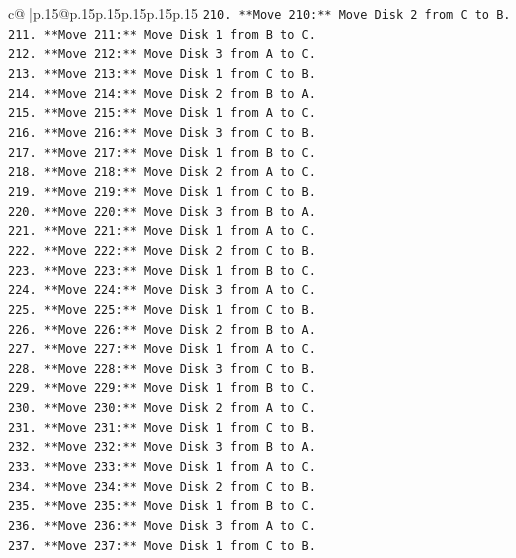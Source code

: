 \documentclass{article}
\begin{document}
{\begin{supertabular}{c@{$\;$}|p{.15\linewidth}@{}p{.15\linewidth}p{.15\linewidth}p{.15\linewidth}p{.15\linewidth}p{.15\linewidth}}
{{{\texttt{210. **Move 210:** Move Disk 2 from C to B.} \\
\texttt{211. **Move 211:** Move Disk 1 from B to C.} \\
\texttt{212. **Move 212:** Move Disk 3 from A to C.} \\
\texttt{213. **Move 213:** Move Disk 1 from C to B.} \\
\texttt{214. **Move 214:** Move Disk 2 from B to A.} \\
\texttt{215. **Move 215:** Move Disk 1 from A to C.} \\
\texttt{216. **Move 216:** Move Disk 3 from C to B.} \\
\texttt{217. **Move 217:** Move Disk 1 from B to C.} \\
\texttt{218. **Move 218:** Move Disk 2 from A to C.} \\
\texttt{219. **Move 219:** Move Disk 1 from C to B.} \\
\texttt{220. **Move 220:** Move Disk 3 from B to A.} \\
\texttt{221. **Move 221:** Move Disk 1 from A to C.} \\
\texttt{222. **Move 222:** Move Disk 2 from C to B.} \\
\texttt{223. **Move 223:** Move Disk 1 from B to C.} \\
\texttt{224. **Move 224:** Move Disk 3 from A to C.} \\
\texttt{225. **Move 225:** Move Disk 1 from C to B.} \\
\texttt{226. **Move 226:** Move Disk 2 from B to A.} \\
\texttt{227. **Move 227:** Move Disk 1 from A to C.} \\
\texttt{228. **Move 228:** Move Disk 3 from C to B.} \\
\texttt{229. **Move 229:** Move Disk 1 from B to C.} \\
\texttt{230. **Move 230:** Move Disk 2 from A to C.} \\
\texttt{231. **Move 231:** Move Disk 1 from C to B.} \\
\texttt{232. **Move 232:** Move Disk 3 from B to A.} \\
\texttt{233. **Move 233:** Move Disk 1 from A to C.} \\
\texttt{234. **Move 234:** Move Disk 2 from C to B.} \\
\texttt{235. **Move 235:** Move Disk 1 from B to C.} \\
\texttt{236. **Move 236:** Move Disk 3 from A to C.} \\
\texttt{237. **Move 237:** Move Disk 1 from C to B.} \\
}}}
\end{supertabular}}
\end{document}
